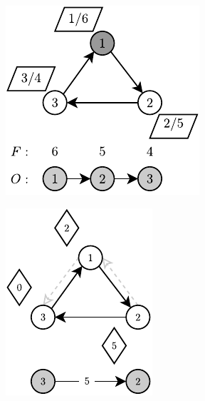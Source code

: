 \begin{figure}[!htbp]
	\centering
	\begin{subfigure}[b]{0.2\textwidth}
		\includegraphics[width=\textwidth]{Chapter_II/BFS-TOPOLOGICAL-SORT-Example/a.pdf}
		\caption{}
	\end{subfigure}%
	\qquad \qquad
	\begin{subfigure}[b]{0.18\textwidth}
		\includegraphics[width=\textwidth]{Chapter_II/BFS-TOPOLOGICAL-SORT-Example/b.pdf}

\end{subfigure}
\end{figure}
